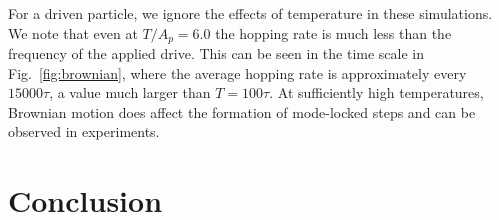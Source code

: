 \documentclass[twocolumn,preprintnumbers,amsmath,amssymb,aps,prx]{revtex4}
\begin{document}
  For a driven particle,
  we ignore 
  the effects of temperature 
  in these simulations.  
  We note that even at $T/A_p = 6.0$ 
  the hopping rate
  is much less than the
  frequency of the applied drive.
  This can be seen in the time scale in Fig.~\ref{fig:brownian},
  where the average hopping rate is approximately
  every $15000\tau$,
  a value much larger than $T = 100\tau$.
  At sufficiently high temperatures,
  Brownian motion does affect 
  the formation of mode-locked steps
  and can be observed in experiments.

\section{Conclusion}
\label{sec:conclusion}	%
\end{document}
